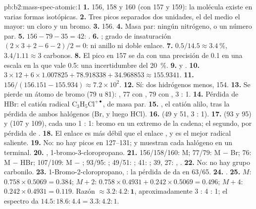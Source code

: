 \begin{solution}{pb:b2:mass-spec-atomic:1}
\textbf{1.} 156, 158 y 160 (con 157 y 159): la molécula existe en varias formas isotópicas.
\textbf{2.} Tres picos separados dos unidades, el del medio el mayor: un cloro y un bromo.
\textbf{3.} 156.
\textbf{4.} Masa par: ningún nitrógeno, o un número par.
\textbf{5.} $156 - 79 - 35 = 42$: .
\textbf{6.} ; grado de insaturación $(2 \times 3 + 2 - 6 - 2)/2 = 0$: ni anillo ni doble
enlace.
\textbf{7.} $0.5/14.5 \approx 3.4~\%$, $3.4/1.11 \approx 3$ carbonos.
\textbf{8.} El pico en 157 se da con una precisión de 0.1 en una escala en la que vale 0.5: una incertidumbre del 20~\%.
\textbf{9.}  y .
\textbf{10.} $3 \times 12 + 6 \times 1.007825 + 78.918338 + 34.968853 \approx 155.9341$.
\textbf{11.} $156/(156.151 - 155.934) \approx 7.2 \times 10^2$.
\textbf{12.} Sí: dos hidrógenos menos, 154.
\textbf{13.} Se pierde un átomo de bromo (79 u 81): , 77 con , 79 con ,
3 : 1.
\textbf{14.} Pérdida de HBr: el catión radical $\mathrm{C_3H_5Cl^{+\bullet}}$, de masa par.
\textbf{15.} , el catión alilo, tras la pérdida de ambos halógenos (Br, y luego HCl).
\textbf{16.}  (49 y 51, 3 : 1).
\textbf{17.}  (93 y 95) y  (107 y 109), cada uno 1 : 1: bromo en un extremo de
la cadena; el segundo, por pérdida de .
\textbf{18.} El enlace  es más débil que el enlace , y  es el mejor radical
saliente.
\textbf{19.} No: no hay picos en 127--131;  y  muestran cada halógeno en un 
terminal.
\textbf{20.} , 1-bromo-3-cloropropano.
\textbf{21.} 156/158/160: M; 77/79: M $-$ Br; 76: M $-$ HBr; 107/109: M $-$ ;
93/95: ; 49/51: ; 41: ; 39, 27: , .
\textbf{22.} No: no hay grupo carbonilo.
\textbf{23.} 1-Bromo-2-cloropropano, : la pérdida de  da  en 63/65.
\textbf{24.} .
\textbf{25.} $M$: $0.758 \times 0.5069 = 0.384$; $M+2$: $0.758 \times 0.4931 + 0.242 \times 0.5069 =
0.496$; $M+4$: $0.242 \times 0.4931 = 0.119$. Razón $\boldsymbol{\approx 3.2 : 4.2 : 1}$, aproximadamente 3 : 4 :
1; el espectro da $14.5 : 18.6 : 4.4 = 3.3 : 4.2 : 1$.
\end{solution}
